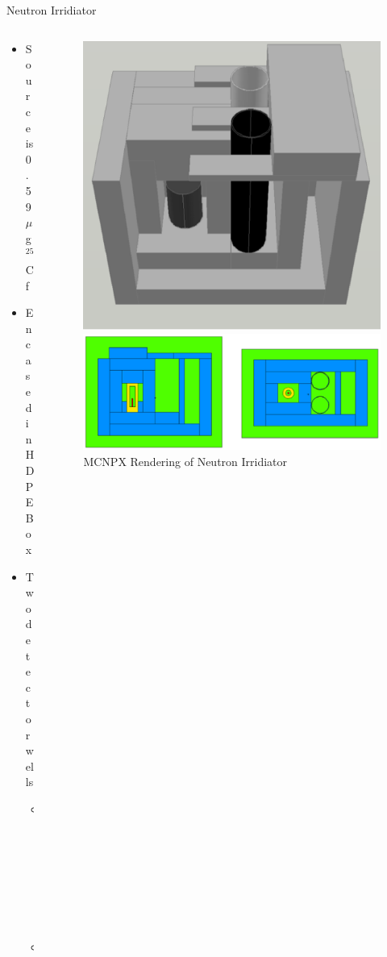 \begin{frame}{Neutron Irridiator}
\begin{columns}[onlytextwidth]
\begin{column}{0.45\textwidth}
	\small
	\begin{itemize}
		\item Source is 0.59 $\mu$g ${}^{252}$Cf
		\item Encased in HDPE Box
		\item Two detector wells
		\begin{itemize}
			\tiny
			\item Lead Well
			\item Cadmium Well
		\end{itemize}
	\end{itemize}
\end{column}
\begin{column}{0.45\textwidth}
	\begin{figure}
		\centering
		\includegraphics[height=0.25\textheight]{images/NeutronIrridiator_CAD.eps}
		\caption{CAD Rendering of Neutron Irridiator}
		\label{fig:NeutronIrridiatorCAD}
		\includegraphics[height=0.25\textheight]{images/NeutronIrridiator_MCNP.eps}
		\caption{MCNPX Rendering of Neutron Irridiator}
		\label{fig:NeutronIrridiatorMNCPX}
	\end{figure}
\end{column}
\end{columns}
\end{frame}

